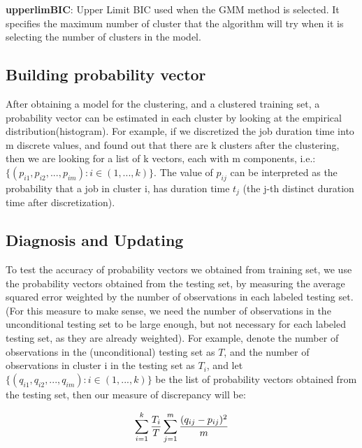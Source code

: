 \documentclass{article}
\begin{document}
\begin{flushleft}
\textbf{upperlimBIC}: Upper Limit BIC used when the GMM method is selected. It
specifies the maximum number of cluster that the algorithm will try when it is
selecting the number of clusters in the model.
\end{flushleft}

\subsection{Building probability vector}

\begin{flushleft}
After obtaining a model for the clustering, and a clustered training set, a
probability vector can be estimated in each cluster by looking at the empirical
distribution(histogram). For example, if we discretized the job duration time
into m discrete values, and found out that there are k clusters after the
clustering, then we are looking for a list of k vectors, each with m components,
i.e.: $\{(p_{i1}, p_{i2}, ..., p_{im}) : i \in (1,...,k)\}$. The value of
$p_{ij}$ can be interpreted as the probability that a job in cluster i, has
duration time $t_j$ (the j-th distinct duration time after discretization).
\end{flushleft}

\subsection{Diagnosis and Updating}

\begin{flushleft}
To test the accuracy of probability vectors we obtained from training set, we
use the probability vectors obtained from the testing set, by measuring the
average squared error weighted by the number of observations in each labeled
testing set. (For this measure to make sense, we need the number of observations
in the unconditional testing set to be large enough, but not necessary for each
labeled testing set, as they are already weighted). For example, denote the
number of observations in the (unconditional) testing set as $T$, and the number
of observations in cluster i in the testing set as $T_i$, and let $\{(q_{i1},
q_{i2}, ..., q_{im}) : i \in (1,...,k)\}$ be the list of probability vectors
obtained from the testing set, then our measure of discrepancy will be:
\end{flushleft}

\begin{flushleft}
\begin{equation}
\centering
        \sum_{i = 1} ^{k} \frac{T_i}{T} \sum_{j = 1}^{m} \frac{(q_{ij} - p_{ij})^2}{m}
\end{equation}
\end{flushleft}
\end{document}
